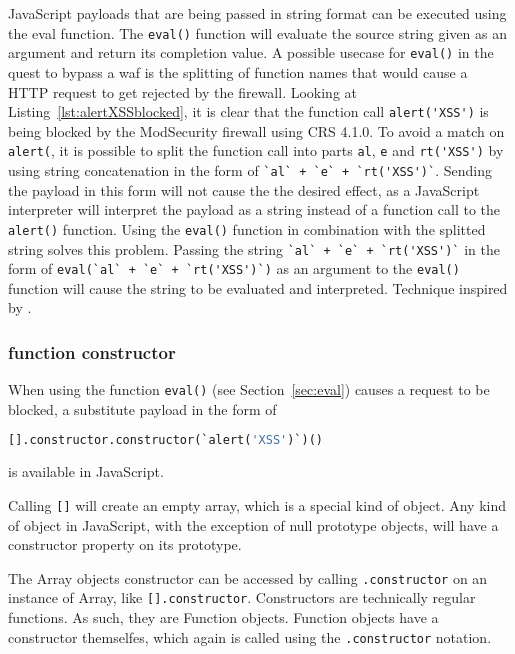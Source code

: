 JavaScript payloads that are being passed in string format can be executed using the eval function. The \verb|eval()| function will evaluate the source string given as an argument and return its completion value. \cite{js/eval}
A possible usecase for \verb|eval()| in the quest to bypass a \gls{waf} is the splitting of function names that would cause a HTTP request to get rejected by the firewall.
Looking at Listing~\ref{lst:alertXSSblocked}, it is clear that the function call \verb|alert('XSS')| is being blocked by the ModSecurity firewall using CRS 4.1.0.
To avoid a match on \verb|alert(|, it is possible to split the function call into parts \verb|al|, \verb|e| and \verb|rt('XSS')| by using string concatenation in the form of \verb|`al` + `e` + `rt('XSS')`|.
Sending the payload in this form will not cause the the desired effect, as a JavaScript interpreter will interpret the payload as a string instead of a function call to the \verb|alert()| function.
Using the \verb|eval()| function in combination with the splitted string solves this problem. Passing the string \verb|`al` + `e` + `rt('XSS')`| in the form of \verb|eval(`al` + `e` + `rt('XSS')`)| as an argument to the \verb|eval()| function will cause the string to be evaluated and interpreted. Technique inspired by \cite{onecons/wafbypass}.

\subsubsection{function constructor}
\label{sec:functionconstructor}

When using the function \verb|eval()| (see Section~\ref{sec:eval}) causes a request to be blocked, a substitute payload in the form of

\begin{lstlisting}[style=basicStyle,language=Python]
[].constructor.constructor(`alert('XSS')`)()
\end{lstlisting}

is available in JavaScript.

Calling \verb|[]| will create an empty array, which is a special kind of object.
Any kind of object in JavaScript, with the exception of null prototype objects, will have a constructor property on its prototype. \cite{js/object}

The Array objects constructor can be accessed by calling \verb|.constructor| on an instance of Array, like \verb|[].constructor|. \cite{js/array}
Constructors are technically regular functions. \cite{js/constructor}
As such, they are Function objects. Function objects have a constructor themselfes, which again is called using the \verb|.constructor| notation.

